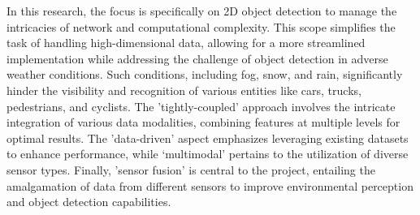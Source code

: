 \documentclass[report.tex]{subfiles}
\begin{document}
        In this research, the focus is specifically on 2D object detection to manage the intricacies of network and computational complexity. This scope simplifies the task of handling high-dimensional data, allowing for a more streamlined implementation while addressing the challenge of object detection in adverse weather conditions. Such conditions, including fog, snow, and rain, significantly hinder the visibility and recognition of various entities like cars, trucks, pedestrians, and cyclists. The 'tightly-coupled' approach involves the intricate integration of various data modalities, combining features at multiple levels for optimal results. The 'data-driven' aspect emphasizes leveraging existing datasets to enhance performance, while `multimodal' pertains to the utilization of diverse sensor types. Finally, 'sensor fusion' is central to the project, entailing the amalgamation of data from different sensors to improve environmental perception and object detection capabilities.
    





\end{document}
